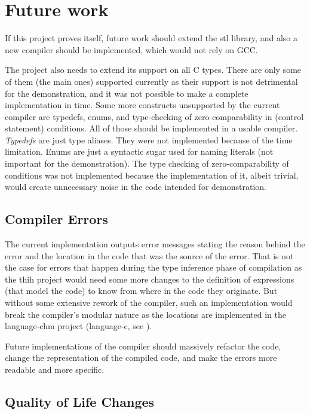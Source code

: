 \section{Future work}

If this project proves itself, future work should extend the stl library, and also a new compiler should be implemented, which would not rely on GCC.

The project also needs to extend its support on all C types. There are only some of them (the main ones) supported currently as their support is not detrimental for the demonstration, and it was not possible to make a complete implementation in time. Some more constructs unsupported by the current compiler are typedefs, enums, and type-checking of zero-comparability in (control statement) conditions. All of those should be implemented in a usable compiler. \emph{Typedefs} are just type aliases. They were not implemented because of the time limitation. Enums are just a syntactic sugar used for naming literals (not important for the demonstration). The type checking of zero-comparability of conditions was not implemented because the implementation of it, albeit trivial, would create unnecessary noise in the code intended for demonstration.

\subsection{Compiler Errors}

The current implementation outputs error messages stating the reason behind the error and the location in the code that was the source of the error. That is not the case for errors that happen during the type inference phase of compilation as the thih \cite{jones1999typing} project would need some more changes to the definition of expressions (that model the code) to know from where in the code they originate. But without some extensive rework of the compiler, such an implementation would break the compiler's modular nature as the locations are implemented in the language-chm project (language-c, see \cite{visq2018language-c}).

Future implementations of the compiler should massively refactor the code, change the representation of the compiled code, and make the errors more readable and more specific.

\subsection{Quality of Life Changes}

